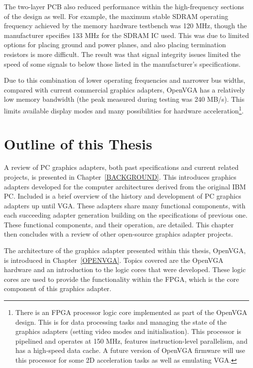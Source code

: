 The two-layer PCB also reduced performance within the high-frequency sections of
the design as well. For example, the maximum stable SDRAM operating frequency
achieved by the memory hardware testbench was 120 MHz, though the manufacturer
specifies 133 MHz for the SDRAM IC used. This was due to limited options for
placing ground and power planes, and also placing termination resistors is more
difficult. The result was that signal integrity issues limited the speed of some
signals to below those listed in the manufacturer's specifications.

Due to this combination of lower operating frequencies and narrower bus widths,
compared with current commercial graphics adapters, OpenVGA has a relatively low
memory bandwidth (the peak measured during testing was 240 MB/s). This limits
available display modes and many possibilities for hardware
acceleration\footnote{There is an FPGA processor logic core implemented as part
of the OpenVGA design. This is for data processing tasks and managing the state
of the graphics adapters (setting video modes and initialisation). This processor
is pipelined and operates at 150 MHz, features instruction-level parallelism, and
has a high-speed data cache. A future version of OpenVGA firmware will use this
processor for some 2D acceleration tasks as well as emulating VGA.}.


\section{Outline of this Thesis}
A review of PC graphics adapters, both past specifications and current related
projects, is presented in Chapter~\ref{BACKGROUND}. This introduces graphics
adapters developed for the computer architectures derived from the original IBM
PC. Included is a brief overview of the history and development of PC graphics
adapters up until VGA. These adapters share many functional components, with each
succeeding adapter generation building on the specifications of previous one.
These functional components, and their operation, are detailed. This chapter then
concludes with a review of other open-source graphics adapter projects.

The architecture of the graphics adapter presented within this thesis, OpenVGA,
is introduced in Chapter~\ref{OPENVGA}. Topics covered are the OpenVGA hardware
and an introduction to the logic cores that were developed. These logic cores are
used to provide the functionality within the FPGA, which is the core component of
this graphics adapter.

